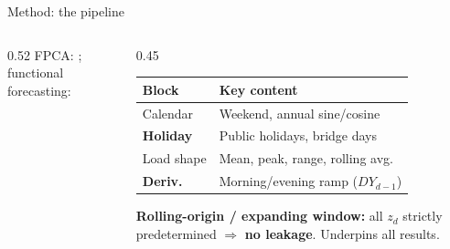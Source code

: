 \documentclass[10pt,aspectratio=169]{beamer}
\begin{document}
\begin{frame}{Method: the pipeline}
\begin{columns}
\begin{column}{0.52\textwidth}
      \scriptsize FPCA: \citep{ramsay_2005, kokoszka_2017};
      functional forecasting: \citep{hyndman_2007}
    \end{column}
    \begin{column}{0.45\textwidth}
      \small
      \begin{tabular}{lp{}}
        \toprule
        Block & Key content \\
        \midrule
        Calendar      & Weekend, annual sine/cosine \\
        \textbf{Holiday} & Public holidays, bridge days \\
        Load shape    & Mean, peak, range, rolling avg.\ \\
        \textbf{Deriv.} & Morning/evening ramp ($DY_{d-1}$) \\
        \bottomrule
      \end{tabular}
      \vspace{0.3em}
      \scriptsize \textbf{Rolling-origin / expanding window:}
      all $z_d$ strictly predetermined $\Rightarrow$ \textbf{no leakage}.
      Underpins all results.
    \end{column}
  \end{columns}
\end{frame}
\end{document}
